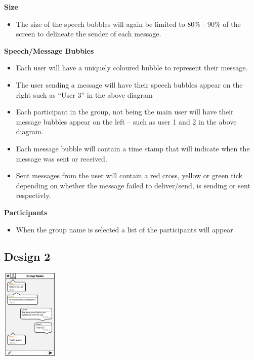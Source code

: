 \documentclass[11pt]{article}
\begin{document}
\textbf{Size}\\
\begin{itemize}
\item	The size of the speech bubbles will again be limited to 80\% - 90\% of the screen to delineate the sender of each message. \\
\end{itemize}

\textbf{Speech/Message Bubbles}\\
\begin{itemize}
\item	Each user will have a uniquely coloured bubble to represent their message.
\item	The user sending a message will have their speech bubbles appear on the right such as “User 3” in the above diagram
\item	Each participant in the group, not being the main user will have their message bubbles appear on the left – such as user 1 and 2 in the above diagram.
\item Each message bubble will contain a time stamp that will indicate when the message was sent or received.
\item Sent messages from the user will contain a red cross, yellow or green tick depending on whether the message failed to deliver/send, is sending or sent respectivly.\\
\end{itemize}

\textbf{Participants}\\
\begin{itemize}
\item	When the group name is selected a list of the participants will appear.
\end{itemize}

\newpage
\subsection{Design 2}
\centerline{\includegraphics[width=100px]{Final.jpg}}
\end{document}
